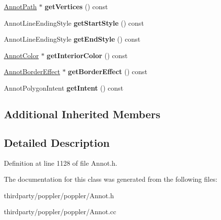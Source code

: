 \begin{DoxyCompactItemize}
\mbox{\label{class_annot_polygon_ac9f25a2592e477b60c7f6016690d7bdd}} 
\hyperlink{class_annot_path}{Annot\+Path} $\ast$ {\bfseries get\+Vertices} () const
\item 
\mbox{\label{class_annot_polygon_a785eff44fee0aeb6d6649029d495b591}} 
Annot\+Line\+Ending\+Style {\bfseries get\+Start\+Style} () const
\item 
\mbox{\label{class_annot_polygon_afab635af0670b64a0ba906d5f9226a4d}} 
Annot\+Line\+Ending\+Style {\bfseries get\+End\+Style} () const
\item 
\mbox{\label{class_annot_polygon_a29071c8a7ede62c29a5a17d0c2f1abe4}} 
\hyperlink{class_annot_color}{Annot\+Color} $\ast$ {\bfseries get\+Interior\+Color} () const
\item 
\mbox{\label{class_annot_polygon_a3aafea6788483781754207937520ce02}} 
\hyperlink{class_annot_border_effect}{Annot\+Border\+Effect} $\ast$ {\bfseries get\+Border\+Effect} () const
\item 
\mbox{\label{class_annot_polygon_aee83b1264a075631fedf30c35ee78b8f}} 
Annot\+Polygon\+Intent {\bfseries get\+Intent} () const
\end{DoxyCompactItemize}
\subsection*{Additional Inherited Members}


\subsection{Detailed Description}


Definition at line 1128 of file Annot.\+h.



The documentation for this class was generated from the following files\+:\begin{DoxyCompactItemize}
\item 
thirdparty/poppler/poppler/Annot.\+h\item 
thirdparty/poppler/poppler/Annot.\+cc\end{DoxyCompactItemize}
